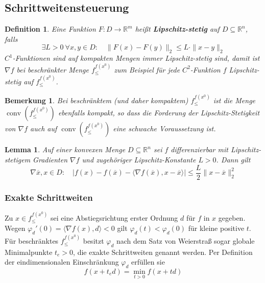 \documentclass[11pt]{scrreprt}
\newcounter{thm}
\theoremstyle{thmstyle}
\numberwithin{thm}{section}
\newtheorem{bemerkung}[thm]{Bemerkung}
\newtheorem{lemma}[thm]{Lemma}
\newtheorem*{definition*}{Definition}
\begin{document}
\subsection*{Schrittweitensteuerung}

\begin{definition*}
	Eine Funktion $F \colon D \rightarrow \mathbb{R}^m$ heißt \textbf{Lipschitz-stetig} auf $D \subseteq \mathbb{R}^n$, falls
	$$ \exists L > 0 ~\forall x, y \in D: \quad \| F(x) - F(y) \|_2 \leq L \cdot \| x - y \|_2 $$
	$C^1$-Funktionen sind auf kompakten Mengen immer Lipschitz-stetig sind, damit ist $\nabla f$ bei beschränkter Menge $f_{\leq}^{f(x^0)}$ zum Beispiel für jede $C^2$-Funktion $f$ Lipschitz-stetig auf $f_{\leq}^{f(x^0)}$.
\end{definition*}

\setcounter{thm}{11}

\begin{bemerkung}
	Bei beschränktem (und daher kompaktem) $f_{\leq}^{f(x^0)}$ ist die Menge $\operatorname{conv}(f_{\leq}^{f(x^0)})$ ebenfalls kompakt, so dass die Forderung der Lipschitz-Stetigkeit von $\nabla f$ auch auf $\operatorname{conv}(f_{\leq}^{f(x^0)})$ eine schwache Voraussetzung ist.	
\end{bemerkung}

\begin{lemma}
	Auf einer konvexen Menge $D \subseteq \mathbb{R}^n$ sei $f$ differenzierbar mit Lipschitz-stetigem Gradienten $\nabla f$ und zugehöriger Lipschitz-Konstante $L > 0$. Dann gilt
	$$ \nabla \overline{x}, x \in D: \quad \left| f(x) - f(\overline{x})- \langle \nabla f(\overline{x}), x - \overline{x} \rangle \right| \leq \frac{L}{2} \| x - \overline{x} \|_2^2 $$
\end{lemma}

\subsubsection*{Exakte Schrittweiten}

Zu $x \in f_{\leq}^{f(x^0)}$ sei eine Abstiegsrichtung erster Ordnung $d$ für $f$ in $x$ gegeben. Wegen $\varphi_d'(0) = \langle \nabla f(x), d \rangle < 0$ gilt $\varphi_d(t) < \varphi_d(0)$ für kleine positive $t$. Für beschränktes $f_{\leq}^{f(x^0)}$ besitzt $\varphi_d$ nach dem Satz von Weierstraß sogar globale Minimalpunkte $t_e> 0$, die exakte Schrittweiten genannt werden. Per Definition der eindimensionalen Einschränkung $\varphi_d$ erfüllen sie
$$ f(x + t_e d) = \min_{t > 0} f(x + td) $$
\end{document}
